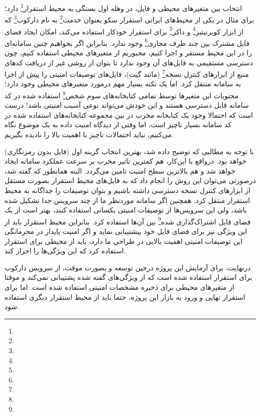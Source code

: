 انتخاب بین متغیرهای محیطی و فایل، در وهله اول بستگی به محیط استقرار\footnote{} دارد؛ برای مثال در یکی از محیط‌های ایرانی استقرار سکو بعنوان خدمت\footnote{} به نام دارکوب\footnote{}\cite{darkube} که از ابزار کوبرنیتیز\footnote{} و داکر\footnote{} برای استقرار خودکار استفاده می‌کند، امکان ایجاد فضای فایل مشترک بین چند ظرف مجازی\footnote{} وجود ندارد. بنابراین اگر بخواهیم چنین سامانه‌ای را در این محیط مستقر و اجرا کنیم، مجبوریم از متغیرهای محیطی استفاده کنیم، چون دسترسی مستقیمی به فایل‌های آن وجود ندارد تا بتوان از روشی غیر از دریافت کدهای منبع از ابزارهای کنترل نسخه\footnote{} (مانند گیت)، فایل‌های توصیفات امنیتی را پیش از اجرا به سامانه منتقل کرد. اما یک نکته بسیار مهم درمورد متغیرهای محیطی وجود دارد؛ محتویات این متغیرها توسط تمامی کتابخانه‌های سوم شخص\footnote{} استفاده شده در کد سامانه قابل دسترسی هستند و این خودش می‌تواند نوعی آسیب امنیتی باشد! درست است که احتمالا وجود یک کتابخانه مخرب در بین مجموعه کتابخانه‌های استفاده شده در کد سامانه بسیار ناچیز است، اما وقتی از دیدگاه امنیت داده به یک موضوع نگاه می‌کنیم، نباید احتمالات ناچیز با اهمیت بالا را نادیده بگیریم.

با توجه به مطالبی که توضیح داده شد، بهترین انتخاب گزینه اول (فایل بدون رمزنگاری) خواهد بود. درواقع با این‌کار، هم کمترین تاثیر مخرب بر سرعت عملکرد سامانه ایجاد خواهد شد و هم بالاترین سطح امنیت تامین می‌گردد. البته همانطور که گفته شد، درصورتی می‌توان این روش را انجام داد که به فایل‌های محیط استقرار بصورت مستقل از ابزارهای کنترل نسخه دسترسی داشته باشیم و بتوان توصیفات را جداگانه به محیط استقرار منتقل کرد. همچنین اگر سامانه موردنظر ما از چند سرویس جدا تشکیل شده باشد، ولی این سرویس‌ها از توصیفات امنیتی یکسانی استفاده کنند، بهتر است از یک فضای فایل اشتراک‌گذاری شده\footnote{} بین آن‌ها استفاده کرد. بنابراین محیط استقرار باید از این ویژگی نیز برای فضای فایل خود پیشتیبانی نماید و اگر امنیت پایدار در محرمانگی این توصیفات امنیتی اهمیت بالایی در طراحی ما دارد، باید از محیطی برای استقرار استفاده کرد که این ویژگی‌ها را احراز کند.

درنهایت، برای آزمایش این پروژه درحین توسعه و بصورت موقت، از سرویس دارکوب برای استقرار استفاده شده است که از ویژگی‌های گفته شده پشتیبانی نمی‌کند و موقتا از متغیرهای محیطی برای ذخیره مشخصات امنیتی استفاده شده است. اما برای استقرار نهایی و ورود به بازار این پروژه، حتما باید از محیط استقرار دیگری استفاده شود.

\newpage


